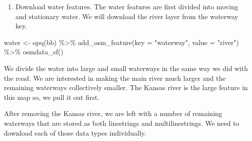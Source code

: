 \documentclass[
  paper=a4,
  ,captions=tableheading
]{scrartcl}
\newenvironment{Shaded}{\begin{snugshade}}{\end{snugshade}}
\newcommand{\AttributeTok}[1]{\textcolor[rgb]{0.77,0.63,0.00}{#1}}
\newcommand{\DecValTok}[1]{\textcolor[rgb]{0.00,0.00,0.81}{#1}}
\newcommand{\FunctionTok}[1]{\textcolor[rgb]{0.00,0.00,0.00}{#1}}
\newcommand{\NormalTok}[1]{#1}
\newcommand{\OtherTok}[1]{\textcolor[rgb]{0.56,0.35,0.01}{#1}}
\newcommand{\SpecialCharTok}[1]{\textcolor[rgb]{0.00,0.00,0.00}{#1}}
\newcommand{\StringTok}[1]{\textcolor[rgb]{0.31,0.60,0.02}{#1}}
\providecommand{\tightlist}{%
  \setlength{\itemsep}{0pt}\setlength{\parskip}{0pt}}
\begin{document}
\begin{enumerate}
\def\labelenumi{\arabic{enumi}.}
\setcounter{enumi}{2}
\tightlist
\item
  Download water features. The water features are first divided into
  moving and stationary water. We will download the river layer from the
  waterway key.
\end{enumerate}

\begin{Shaded}
\begin{Highlighting}[]
\NormalTok{water }\OtherTok{\textless{}{-}} 
  \FunctionTok{opq}\NormalTok{(bb) }\SpecialCharTok{\%\textgreater{}\%} 
  \FunctionTok{add\_osm\_feature}\NormalTok{(}\AttributeTok{key =} \StringTok{"waterway"}\NormalTok{, }\AttributeTok{value =} \StringTok{"river"}\NormalTok{) }\SpecialCharTok{\%\textgreater{}\%} 
  \FunctionTok{osmdata\_sf}\NormalTok{()}
\end{Highlighting}
\end{Shaded}

We divide the water into large and small waterways in the same way we
did with the road. We are interested in making the main river much
larger and the remaining waterways collectively smaller. The Kansas
river is the large feature in this map so, we pull it out first.

\begin{Shaded}
\end{Shaded}

After removing the Kansas river, we are left with a number of remaining
waterways that are stored as both linestrings and multilinestrings. We
need to download each of those data types individually.
\end{document}
